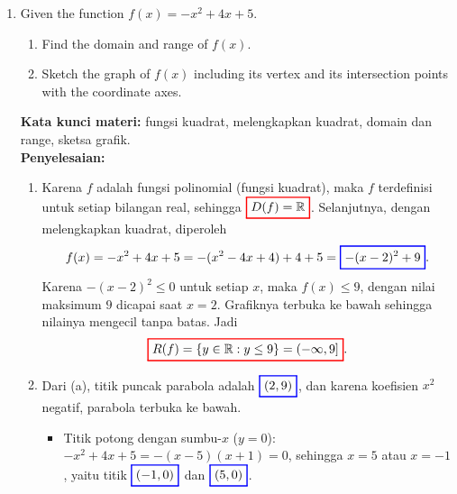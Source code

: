 \documentclass[10pt,openany,a4paper]{article}
\theoremstyle{definition}
\theoremstyle{definition}
\theoremstyle{plain}
\newenvironment{jawab}[2][tes]{%
\par\noindent\textbf{Kata kunci materi:} #1.\\
\textbf{Penyelesaian:} #2%
}{}
\begin{document}
\begin{enumerate}
    \item Given the function $f(x)=-x^2+4x+5$.
    \begin{enumerate}
        \item Find the domain and range of $f(x)$.
        \item Sketch the graph of $f(x)$ including its vertex and its intersection points with the coordinate axes.
    \end{enumerate}
    \begin{jawab}[fungsi kuadrat, melengkapkan kuadrat, domain dan range, sketsa grafik]{
        \begin{enumerate}
            \item Karena $f$ adalah fungsi polinomial (fungsi kuadrat), maka $f$ terdefinisi untuk setiap bilangan real, sehingga $\colorlet{oldcolor}{.}
        \color{red}
        \setlength{\fboxrule}{1pt} \boxed{\color{oldcolor}D(f)=\mathbb{R}}\color{oldcolor}$. Selanjutnya, dengan melengkapkan kuadrat, diperoleh
            \begin{align*}
                f(x) = -x^2+4x+5 = -(x^2-4x+4)+4+5 = \colorlet{oldcolor}{.}
        \color{blue}
        \setlength{\fboxrule}{1pt} \boxed{\color{oldcolor}-(x-2)^2+9}\color{oldcolor}.
            \end{align*}
            Karena $-(x-2)^2\leq 0$ untuk setiap $x$, maka $f(x)\leq 9$, dengan nilai maksimum $9$ dicapai saat $x=2$. Grafiknya terbuka ke bawah sehingga nilainya mengecil tanpa batas. Jadi
            \begin{align*}
                \colorlet{oldcolor}{.}
        \color{red}
        \setlength{\fboxrule}{1pt} \boxed{\color{oldcolor}R(f)=\{y\in\mathbb{R} : y\leq 9\}=(-\infty,9]}\color{oldcolor}.
            \end{align*}
            \item Dari (a), titik puncak parabola adalah $\colorlet{oldcolor}{.}
        \color{blue}
        \setlength{\fboxrule}{1pt} \boxed{\color{oldcolor}(2,9)}\color{oldcolor}$, dan karena koefisien $x^2$ negatif, parabola terbuka ke bawah.
            \begin{itemize}
                \item Titik potong dengan sumbu-$x$ ($y=0$): $-x^2+4x+5=-(x-5)(x+1)=0$, sehingga $x=5$ atau $x=-1$, yaitu titik $\colorlet{oldcolor}{.}
        \color{blue}
        \setlength{\fboxrule}{1pt} \boxed{\color{oldcolor}(-1,0)}\color{oldcolor}$ dan $\colorlet{oldcolor}{.}
        \color{blue}
        \setlength{\fboxrule}{1pt} \boxed{\color{oldcolor}(5,0)}\color{oldcolor}$.

\end{itemize}
\end{enumerate}}
\end{jawab}
\end{enumerate}
\end{document}
